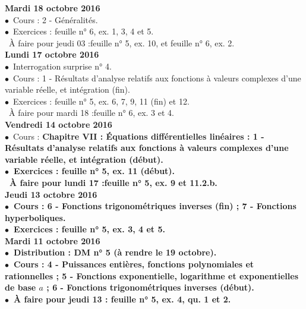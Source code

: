 \documentclass[12pt,a4paper]{article}
\begin{document}
\noindent\textbf{\bf Mardi 18 octobre 2016 }\\
$\bullet$\ Cours : 2 - Généralités.\\
$\bullet$\ Exercices : feuille n° 6, ex. 1, 3, 4 et 5.\\
\bu\ À faire pour jeudi 03 :feuille n° 5, ex. 10, et feuille n° 6, ex. 2.\vspace{.4cm}\\

\noindent\textbf{Lundi 17 octobre 2016 }\\
$\bullet$\ Interrogation surprise n° 4.\\
$\bullet$\ Cours : 1 - Résultats d'analyse relatifs aux fonctions à valeurs complexes d'une variable réelle, et 
intégration (fin).\\
$\bullet$\ Exercices : feuille n° 5, ex. 6, 7, 9, 11 (fin) et 12.\\
\bu\ À faire pour mardi 18 :feuille n° 6, ex. 3 et 4.\vspace{.4cm}\\
   
\noindent\textbf{Vendredi 14 octobre 2016 }\\
$\bullet$\ Cours : \bf Chapitre VII \rm : Équations différentielles linéaires : 1 - Résultats d'analyse relatifs aux 
fonctions à valeurs complexes d'une variable réelle, et intégration (début).\\
$\bullet$\ Exercices : feuille n° 5, ex. 11 (début).\\
\bu\ À faire pour lundi 17 :feuille n° 5, ex. 9 et 11.2.b.\vspace{.4cm}\\

\noindent\textbf{Jeudi 13 octobre 2016 }\\
$\bullet$\ Cours :  6 - Fonctions trigonométriques inverses (fin) ; 7 - Fonctions hyperboliques.\\
$\bullet$\ Exercices : feuille n° 5, ex. 3, 4 et 5.\vspace{.4cm}\\

\noindent\textbf{\bf Mardi 11 octobre 2016 }\\
$\bullet$\ Distribution : DM n° 5 (à rendre le 19 octobre).\\
$\bullet$\ Cours : 4 - Puissances entières, fonctions 
polynomiales et rationnelles ; 5 - Fonctions exponentielle, logarithme et 
exponentielles de base $a$ ; 6 - Fonctions trigonométriques inverses (début).\\
$\bullet$\ À faire pour jeudi 13 : feuille n° 5, ex. 4, qu. 1 et 2.\vspace{.4cm}\\
\end{document}
